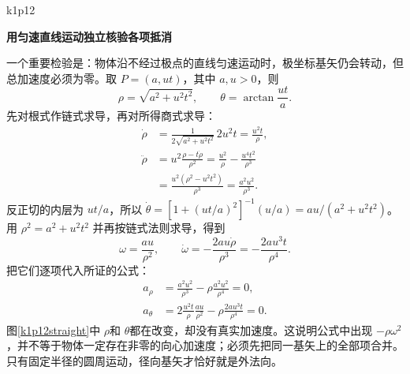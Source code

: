 \begin{drillsolution}{k1p12}

\par\medskip{}\noindent\textbf{用匀速直线运动独立核验各项抵消}\par\nobreak
一个重要检验是：物体沿不经过极点的直线匀速运动时，极坐标基矢仍会转动，但总加速度必须为零。取
$P=(a,ut)$，其中 $a,u>0$，则
\[\rho=\sqrt{a^2+u^2t^2},\qquad
\theta=\arctan\frac{ut}{a}.\]
先对根式作链式求导，再对所得商式求导：
\begin{align*}
\dot\rho&=\frac1{2\sqrt{a^2+u^2t^2}}\,2u^2t
=\frac{u^2t}{\rho},\\
\ddot\rho&=u^2\frac{\rho-t\dot\rho}{\rho^2}
=\frac{u^2}{\rho}-\frac{u^4t^2}{\rho^3}\\
&=\frac{u^2(\rho^2-u^2t^2)}{\rho^3}
=\frac{a^2u^2}{\rho^3}.
\end{align*}
反正切的内层为 $ut/a$，所以 $\dot\theta=[1+(ut/a)^2]^{-1}(u/a)=au/(a^2+u^2t^2)$。用 $\rho^2=a^2+u^2t^2$ 并再按链式法则求导，得到
\[\omega=\frac{au}{\rho^2},\qquad
\dot\omega=-\frac{2au\dot\rho}{\rho^3}
 =-\frac{2au^3t}{\rho^4}.\]
把它们逐项代入所证的公式：
\begin{align*}
a_\rho&=\frac{a^2u^2}{\rho^3}
 -\rho\frac{a^2u^2}{\rho^4}=0,\\
a_\theta&=2\frac{u^2t}{\rho}\frac{au}{\rho^2}
 -\rho\frac{2au^3t}{\rho^4}=0.
\end{align*}
图\ref{k1p12straight}中 $\rho$和 $\theta$都在改变，却没有真实加速度。这说明公式中出现 $-\rho\omega^2$，并不等于物体一定存在非零的向心加速度；必须先把同一基矢上的全部项合并。只有固定半径的圆周运动，径向基矢才恰好就是外法向。
\end{drillsolution}
